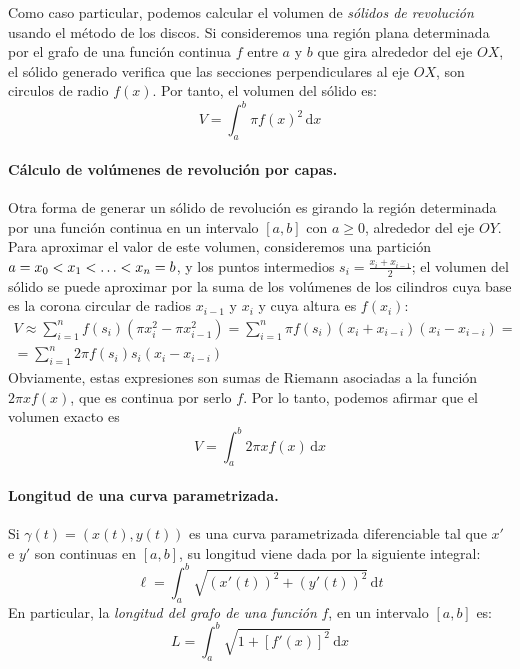 
Como caso particular, podemos calcular el volumen de \emph{sólidos de revolución} usando el método de los discos.
Si consideremos una región plana determinada por el grafo de una función
continua $f$ entre $a$ y $b$ que gira alrededor del eje $OX$,
el sólido generado verifica que las secciones perpendiculares al
eje $OX$, son circulos de radio $f(x)$. Por tanto, el volumen del sólido es:
\[
V=\int_a^b \pi f(x)^2\,\mathrm dx
\]

\paragraph{Cálculo de volúmenes de revolución por capas.}
Otra forma de generar un sólido de revolución es girando la región determinada por una función continua en un intervalo $[a,b]$ con $a\geq 0$, alrededor del eje $OY$. Para aproximar el valor de este volumen, consideremos una partición $a=x_0\sle x_1\sle \dots\sle x_n=b$, y los puntos intermedios $s_i=\frac{x_i+x_{i-1}}2$;
el volumen del sólido se puede aproximar por la suma de los volúmenes de los cilindros cuya base es la corona circular de radios $x_{i-1}$ y $x_i$ y cuya altura es $f(x_i)$:
\begin{multline*}
V \approx \sum_{i=1}^n f(s_i)(\pi x_i^2-\pi x_{i-1}^2) =
\sum_{i=1}^n \pi f(s_i) (x_i+x_{i-i})(x_i-x_{i-i}) = \\ =
\sum_{i=1}^n 2 \pi f(s_i) s_i (x_i-x_{i-i})
\end{multline*}
%
Obviamente, estas expresiones son sumas de Riemann asociadas a la función $2\pi xf(x)$, que es continua por serlo $f$.
Por lo tanto, podemos afirmar que el volumen exacto es
\[
V=\int_a^b 2\pi xf(x)\,\mathrm dx
\]
%



\paragraph{Longitud de una curva parametrizada.} Si $\gamma(t)=(x(t),y(t))$ es una curva parametrizada diferenciable tal que $x'$ e $y'$ son continuas en $[a,b]$, su longitud viene dada por la siguiente integral:
\[
\ell=\int_a^b\sqrt{(x'(t))^2+(y'(t))^2}\,\mathrm dt
\]
En particular, la \emph{longitud del grafo de una función} $f$, en un intervalo $[a,b]$ es:
\[
L=\int_a^b \sqrt{1+[f'(x)]^2}\,\mathrm dx
\]

